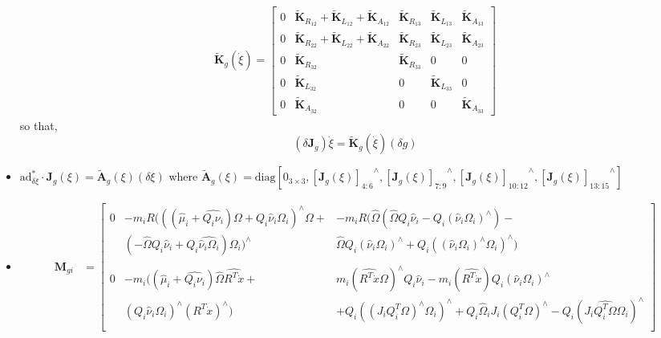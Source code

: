 \documentclass[10pt]{article}
\newcommand{\ad}{\ensuremath{\mathrm{ad}}}
\begin{document}
\begin{itemize}
	\begin{align*}
	\tilde{\mathbf{K}}_g(\dot{\xi}) = \begin{bmatrix}
	0 & \tilde{\mathbf{K}}_{R_{12}} + \tilde{\mathbf{K}}_{L_{12}} + \tilde{\mathbf{K}}_{A_{12}} & \tilde{\mathbf{K}}_{R_{13}} & \tilde{\mathbf{K}}_{L_{13}} & \tilde{\mathbf{K}}_{A_{13}}\\
	0 & \tilde{\mathbf{K}}_{R_{22}} + \tilde{\mathbf{K}}_{L_{22}} + \tilde{\mathbf{K}}_{A_{22}} & \tilde{\mathbf{K}}_{R_{23}} & \tilde{\mathbf{K}}_{L_{23}} & \tilde{\mathbf{K}}_{A_{23}} \\
	0 & \tilde{\mathbf{K}}_{R_{32}} & \tilde{\mathbf{K}}_{R_{33}} & 0 & 0 \\
	0 & \tilde{\mathbf{K}}_{L_{32}} & 0 & \tilde{\mathbf{K}}_{L_{33}} & 0 \\
	0 & \tilde{\mathbf{K}}_{A_{32}} & 0 & 0 & \tilde{\mathbf{K}}_{A_{33}}
	\end{bmatrix}
	\end{align*}
	so that,
	\begin{equation*}
	(\delta \mathbf{J}_g) \dot{\xi} = \tilde{\mathbf{K}}_g (\dot{\xi}) (\delta g)
	\end{equation*}
	\item $ \ad^*_{\delta \xi} \cdot \mathbf{J}_g(\xi) = \tilde{\mathbf{A}}_g(\xi)(\delta \xi) $ where $ \tilde{\mathbf{A}}_g(\xi) = \mathrm{diag}[0_{3\times 3}, {[\mathbf{J}_g(\xi)]_{4:6}}^{\wedge}, {[\mathbf{J}_g(\xi)]_{7:9}}^{\wedge}, {[\mathbf{J}_g(\xi)]_{10:12}}^{\wedge}, {[\mathbf{J}_g(\xi)]_{13:15}}^{\wedge}] $
	\item \begin{align*}
	\mathbf{M}_{gi} &= \begin{bmatrix}
	0 & -m_i R \bigl(((\hat\mu_i+\widehat{Q_i\nu_i})\Omega + Q_i\hat\nu_i\Omega_i)^\wedge \Omega +
	& -m_i R \bigl(\hat{\Omega} (\hat{\Omega} Q_i \hat{\nu}_i - Q_i(\hat{\nu}_i\Omega_i)^\wedge) - \\
	& (-\hat\Omega Q_i \hat\nu_i + Q_i \widehat{\hat \nu_i \Omega_i})\Omega_i\bigr) ^\wedge
	& \hat{\Omega} Q_i (\hat{\nu}_i\Omega_i)^\wedge + Q_i ((\hat{\nu}_i\Omega_i)^\wedge\Omega_i)^\wedge \bigr)\\\\
	0 & - m_i \bigl( (\hat\mu_i + \widehat{Q_i\nu_i}) \hat{\Omega} \widehat{R^T \dot x} + & m_i(\widehat{R^T \dot x} \Omega)^\wedge Q_i \hat{\nu}_i - m_i(\widehat{R^T \dot x}) Q_i (\hat{\nu}_i \Omega_i)^\wedge \\
	& (Q_i \hat{\nu}_i \Omega_i)^\wedge (R^T \dot{x})^\wedge \bigr) & + Q_i ((J_iQ_i^T\Omega)^\wedge \Omega_i)^\wedge + Q_i \hat{\Omega}_i J_i (Q_i^T \Omega)^\wedge - Q_i (J_i \widehat{Q_i^T\Omega}\Omega_i)^\wedge \\

\end{bmatrix}
\end{align*}
\end{itemize}
\end{document}
